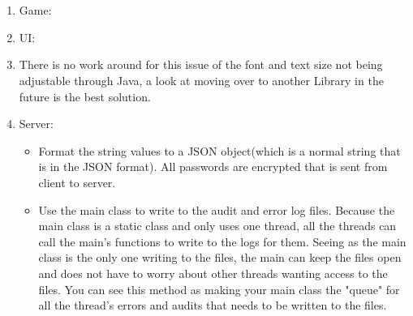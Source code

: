 \documentclass[letterpaper]{article}
\begin{document}
		\vspace{0.2in}
		\section*{\colorbox{blue}{}}
		\vspace{0.1in}	
			
			\begin{enumerate}
				\item Game:
				
				\item UI: \item There is no work around for this issue of the font and text size not being adjustable through Java, a look at moving over to another Library in the future is the best solution.
				
				\item Server:
					\begin{itemize}
						\item Format the string values to a JSON object(which is a normal string that is in the JSON format). All passwords are encrypted that is sent from client to server.
					\end{itemize}
					\begin{itemize}
						\item Use the main class to write to the audit and error log files. Because the main class is a static class and only uses one thread, all the threads can call the main's functions to write to the logs for them. Seeing as the main class is the only one writing to the files, the main can keep the files open and does not have to worry about other threads wanting access to the files. You can see this method as making your main class the "queue" for all the thread's errors and audits that needs to be written to the files. 
					\end{itemize}
			\end{enumerate}
				
		\vspace{0.2in}
		\section*{\colorbox{blue}{}}
		\vspace{0.1in}
			
\end{document}

